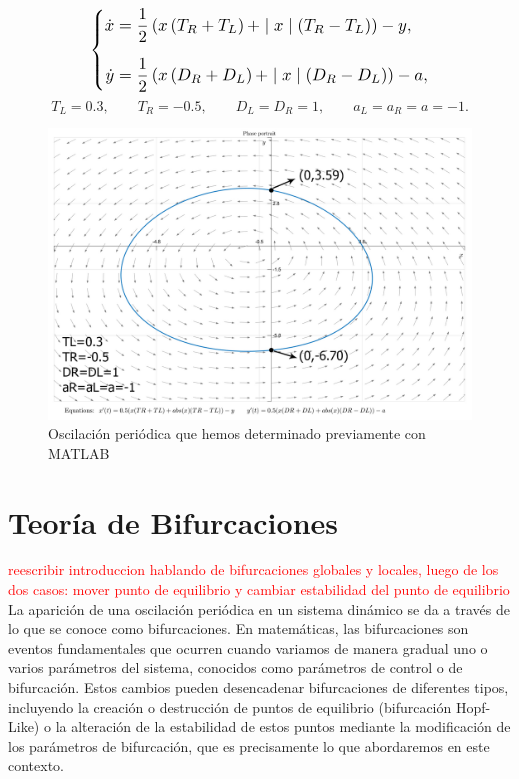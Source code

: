 \documentclass[12pt,a4paper]{report} %
\begin{document}
	\begin{equation}
		\label{eq:clejem}
		\scalebox{1.2}{$\displaystyle
			\left\{
			\begin{aligned}
			\dot{x}&=\frac{1}{2}\left( x\left(T_R+T_L\right)+\mid x\mid \left(T_R-T_L\right)\right)-y,
				 \\[2mm]
			\dot{y}&=\frac{1}{2}\left( x\left(D_R+D_L\right)+\mid x\mid \left(D_R-D_L\right)\right)-a,
			\end{aligned}
			\right. 
			$}
	\end{equation}\smallskip
	\begin{equation*}
		T_L=0.3, \qquad T_R=-0.5, \qquad D_L=D_R=1, \qquad a_L=a_R=a=-1.
	\end{equation*}\smallskip
	
	\begin{figure}[h]
		\centering
		\includegraphics[width=1\textwidth]{clejemplo.jpg}
		\caption{Oscilación periódica que hemos determinado previamente con MATLAB}
		\label{fig:clejemplo}
	\end{figure}\smallskip
	
	\newpage
	
	\chapter{Teoría de Bifurcaciones}
	\label{cap.5}
	\textcolor{red}{reescribir introduccion hablando de bifurcaciones globales y locales, luego de los dos casos: mover punto de equilibrio y cambiar estabilidad del punto de equilibrio}
	La aparición de una oscilación periódica en un sistema dinámico se da a través de lo que se conoce como bifurcaciones. En matemáticas, las bifurcaciones son eventos fundamentales que ocurren cuando variamos de manera gradual uno o varios parámetros del sistema, conocidos como parámetros de control o de bifurcación. Estos cambios pueden desencadenar bifurcaciones de diferentes tipos, incluyendo la creación o destrucción de puntos de equilibrio (bifurcación Hopf-Like) o la alteración de la estabilidad de estos puntos mediante la modificación de los parámetros de bifurcación, que es precisamente lo que abordaremos en este contexto.
\end{document}
